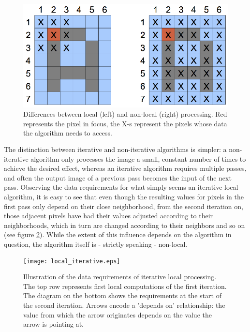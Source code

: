 \documentclass [12pt,a4paper]{report}
\begin{document}
\begin{figure}[h]
\begin{center}
\includegraphics[]{local_nonlocal.eps} %
\caption{Differences between local (left) and non-local (right) processing. Red represents the pixel in focus, the X-s represent the pixels whose data the algorithm needs to access.}
\label{fig_local_nonlocal}
\end{center}
\end{figure}

The distinction between iterative and non-iterative algorithms is simpler: a non-iterative algorithm only processes the image a small, constant number of times to achieve the desired effect, whereas an iterative algorithm requires multiple passes, and often the output image of a previous pass becomes the input of the next pass. Observing the data requirements for what simply seems an iterative local algorithm, it is easy to see that even though the resulting values for pixels in the first pass only depend on their close neighborhood, from the second iteration on, those adjacent pixels have had their values adjusted according to their neighborhoods, which in turn are changed according to their neighbors and so on (see figure \ref{fig_local_iterative}). While the extent of this influence depends on the algorithm in question, the algorithm itself is - strictly speaking - non-local.

\begin{figure}[h]
\begin{center}
\texttt{[image: local\_iterative.eps]} %
\caption{Illustration of the data requirements of iterative local processing. The top row represents first local computations of the first iteration. The diagram on the bottom shows the requirements at the start of the second iteration. Arrows encode a 'depends on' relationship: the value from which the arrow originates depends on the value the arrow is pointing at.}
\label{fig_local_iterative}
\end{center}
\end{figure}
\end{document}
